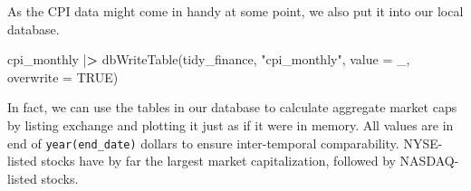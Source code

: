 \documentclass[
]{book}
\newenvironment{Shaded}{\begin{snugshade}}{\end{snugshade}}
\newcommand{\AttributeTok}[1]{\textcolor[rgb]{0.61,0.61,0.61}{#1}}
\newcommand{\ConstantTok}[1]{\textcolor[rgb]{0,0,0}{#1}}
\newcommand{\ErrorTok}[1]{\textcolor[rgb]{0.14,0.14,0.14}{\textbf{#1}}}
\newcommand{\FunctionTok}[1]{\textcolor[rgb]{0,0,0}{#1}}
\newcommand{\NormalTok}[1]{#1}
\newcommand{\OtherTok}[1]{\textcolor[rgb]{0.37,0.37,0.37}{#1}}
\newcommand{\SpecialCharTok}[1]{\textcolor[rgb]{0,0,0}{#1}}
\newcommand{\StringTok}[1]{\textcolor[rgb]{0.5,0.5,0.5}{#1}}
\begin{document}
\begin{Shaded}
\end{Shaded}

As the CPI data might come in handy at some point, we also put it into our local database.

\begin{Shaded}
\begin{Highlighting}[]
\NormalTok{cpi\_monthly }\SpecialCharTok{|}\ErrorTok{\textgreater{}}
  \FunctionTok{dbWriteTable}\NormalTok{(tidy\_finance, }\StringTok{"cpi\_monthly"}\NormalTok{, }\AttributeTok{value =}\NormalTok{ \_, }\AttributeTok{overwrite =} \ConstantTok{TRUE}\NormalTok{)}
\end{Highlighting}
\end{Shaded}

In fact, we can use the tables in our database to calculate aggregate market caps by listing exchange and plotting it just as if it were in memory. All values are in end of \texttt{year(end\_date)} dollars to ensure inter-temporal comparability. NYSE-listed stocks have by far the largest market capitalization, followed by NASDAQ-listed stocks.
\end{document}
